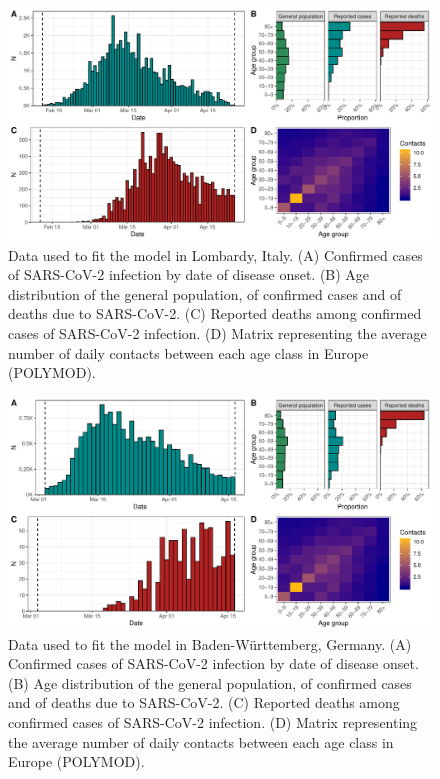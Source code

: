 \documentclass{article}
\begin{document}
\begin{figure}[h]
		\centering
		\includegraphics[width=15cm]{../format_output/figures/data_lombardy.pdf}
		\caption{Data used to fit the model in Lombardy, Italy. (A) Confirmed cases of SARS-CoV-2 infection by date of disease onset. (B) Age distribution of the general population, of confirmed cases and of deaths due to SARS-CoV-2. (C) Reported deaths among confirmed cases of SARS-CoV-2 infection. (D) Matrix representing the average number of daily contacts between each age class in Europe (POLYMOD).}
		\label{fig:lombardy}
\end{figure}

\begin{figure}[h]
		\centering
		\includegraphics[width=15cm]{../format_output/figures/data_badenw.pdf}
		\caption{Data used to fit the model in Baden-Württemberg, Germany. (A) Confirmed cases of SARS-CoV-2 infection by date of disease onset. (B) Age distribution of the general population, of confirmed cases and of deaths due to SARS-CoV-2. (C) Reported deaths among confirmed cases of SARS-CoV-2 infection. (D) Matrix representing the average number of daily contacts between each age class in Europe (POLYMOD).}
		\label{fig:badenw}
\end{figure}
\end{document}
